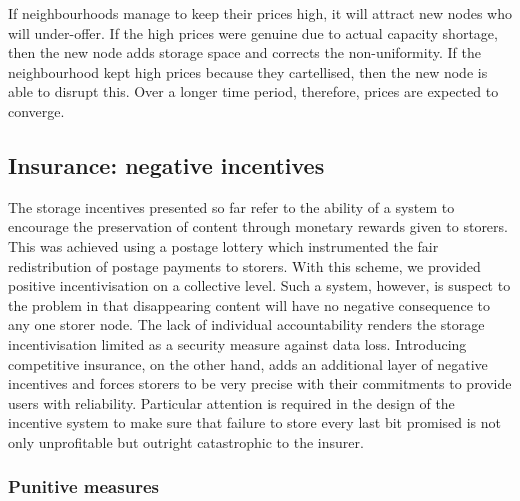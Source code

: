 If neighbourhoods manage to keep their prices high, it will attract new nodes who will under-offer. If the high prices were genuine due to actual capacity shortage, then the new node adds storage space and corrects the non-uniformity. If the neighbourhood kept high prices because they cartellised, then the new node is able to disrupt this. Over a longer time period, therefore, prices are expected to converge.








\subsection{Insurance: negative incentives \statusorange}\label{sec:chunk-insurance}


The storage incentives presented so far refer to the ability of a system to encourage the preservation of content through monetary rewards given to storers. This was achieved using a postage lottery which instrumented the fair redistribution of postage payments to storers. With this scheme, we provided positive incentivisation on a collective level. Such a system,  however, is suspect to the  problem in that disappearing content will have no negative consequence to any one storer node. The lack of individual accountability renders the storage incentivisation limited as a security measure against data loss. Introducing competitive insurance, on the other hand, adds an additional layer of negative incentives and forces storers to be very precise with their commitments to provide users with reliability. Particular attention is required in the design of the incentive system to make sure that failure to store every last bit promised is not only unprofitable but outright catastrophic to the insurer. 

\subsubsection{Punitive measures}

